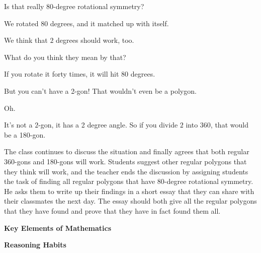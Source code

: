 {\begin{scriptlist}
      \item [Teacher:] Is that really 80-degree rotational symmetry?
      
      \item [Student 3:] We rotated $80$ degrees, and it matched up with itself.
      
      \item [Student 4:] We think that $2$ degrees should work, too.
      
      \item [Teacher:] What do you think they mean by that?
      
      \item [Student 4:] If you rotate it forty times, it will hit $80$ degrees.
      
      \item [Student 5:] But you can't have a 2-gon! That wouldn't even be a polygon.
      
      \item [Student 4:] Oh.
      
      \item [Student 6:] It's not a $2$-gon, it has a 2 degree angle. So if you divide $2$ into $360$, that would be a 180-gon. 
    \end{scriptlist}

    The class continues to discuss the situation and finally agrees that both regular 360-gons and 180-gons will work. Students suggest other regular polygons that they think will work, and the teacher ends the discussion by assigning students the task of finding all regular polygons that have 80-degree rotational symmetry. He asks them to write up their findings in a short essay that they can share with their classmates the next day. The essay should both give all the regular polygons that they have found and prove that they have in fact found them all.

    \textbf{Key Elements of Mathematics}

    \begin{hanglist}
    \end{hanglist}

    \textbf{Reasoning Habits}

    \begin{hanglist}
      \vspace{\baselineskip}


    \end{hanglist}
  }
